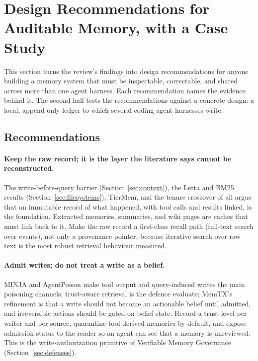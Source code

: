 \documentclass[11pt]{article}
\begin{document}
\section{Design Recommendations for Auditable Memory, with a Case Study}
\label{sec:implications}

This section turns the review's findings into design recommendations for anyone building a memory system that must be inspectable, correctable, and shared across more than one agent harness. Each recommendation names the evidence behind it. The second half tests the recommendations against a concrete design: a local, append-only ledger to which several coding-agent harnesses write.

\subsection{Recommendations}

\paragraph{Keep the raw record; it is the layer the literature says cannot be reconstructed.} The write-before-query barrier (Section~\ref{sec:context}), the Letta and BM25 results (Section~\ref{sec:filesystems}), TierMem, and the tenure crossover of \citet{spencer2026groundtruth} all argue that an immutable record of what happened, with tool calls and results linked, is the foundation. Extracted memories, summaries, and wiki pages are caches that must link back to it. Make the raw record a first-class recall path (full-text search over events), not only a provenance pointer, because iterative search over raw text is the most robust retrieval behaviour measured.

\paragraph{Admit writes; do not treat a write as a belief.} MINJA and AgentPoison make tool output and query-induced writes the main poisoning channels; trust-aware retrieval is the defence \citet{sunil2026poisoning} evaluate; MemTX's refinement is that a write should not become an actionable belief until admitted, and irreversible actions should be gated on belief state. Record a trust level per writer and per source, quarantine tool-derived memories by default, and expose admission status to the reader so an agent can see that a memory is unreviewed. This is the write-authorization primitive of Verifiable Memory Governance (Section~\ref{sec:defenses}).
\end{document}

